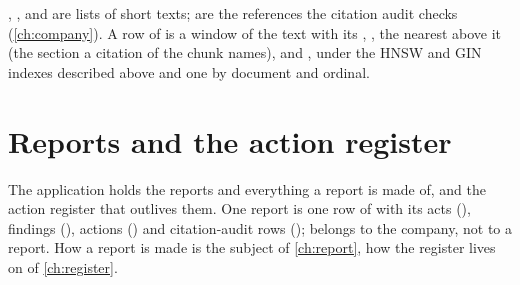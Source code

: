 , ,  and  are lists of
short texts;  are the references the citation audit checks
(\cref{ch:company}). A row of
 is a window of the text with its ,
, the nearest  above it (the section a citation of the chunk
names),  and , under the HNSW and GIN indexes described above and
one by document and ordinal.

\section{Reports and the action register}\label{sec:data:analysis}

The application  holds the reports and everything a report is made of, and the
action register that outlives them. One report is one row of  with its acts
(), findings (), actions () and
citation-audit rows ();  belongs to the company,
not to a report. How a report is made is the subject of \cref{ch:report}, how the register
lives on of \cref{ch:register}.

